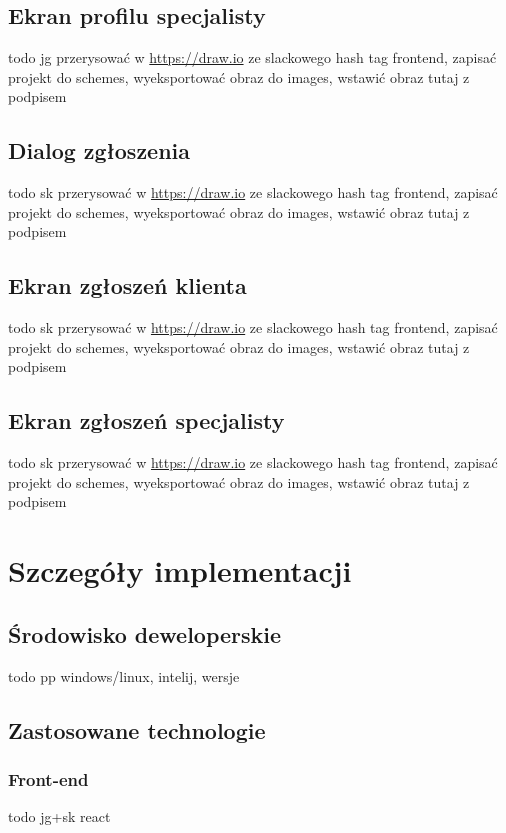 \documentclass{article}
\begin{document}
	\subsection{Ekran profilu specjalisty}	
	todo jg przerysować w \url{https://draw.io} ze slackowego hash tag frontend, zapisać projekt do schemes, wyeksportować obraz do images, wstawić obraz tutaj z podpisem	
	
	\subsection{Dialog zgłoszenia}	
	todo sk przerysować w \url{https://draw.io} ze slackowego hash tag frontend, zapisać projekt do schemes, wyeksportować obraz do images, wstawić obraz tutaj z podpisem	
	
	\subsection{Ekran zgłoszeń klienta}
	todo sk przerysować w \url{https://draw.io} ze slackowego hash tag frontend, zapisać projekt do schemes, wyeksportować obraz do images, wstawić obraz tutaj z podpisem
	
	\subsection{Ekran zgłoszeń specjalisty}
	todo sk przerysować w \url{https://draw.io} ze slackowego hash tag frontend, zapisać projekt do schemes, wyeksportować obraz do images, wstawić obraz tutaj z podpisem  
  
	\section{Szczegóły implementacji}  
  
	\subsection{Środowisko deweloperskie}  
	todo pp windows/linux, intelij, wersje
  
	\subsection{Zastosowane technologie}

	\subsubsection{Front-end}	
	todo jg+sk react
	
\end{document}
